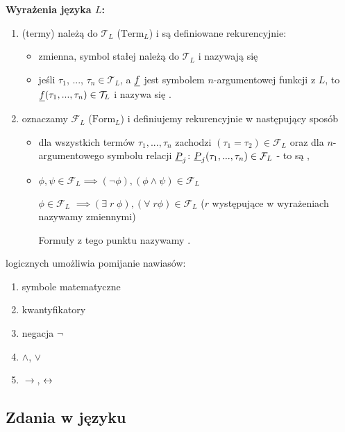 \textbf{Wyrażenia języka $L$:}
\begin{enumerate}[label=\alph*)]
  \item {} (termy) należą do $\mathcal{T}_L$ ($\text{Term}_L$) i są definiowane rekurencyjnie:
    \begin{itemize}
      \item zmienna, symbol stałej należą do $\mathcal{T}_L$ i nazywają się 
      \item jeśli $\tau_1$, ..., $\tau_n\in \mathcal{T}_L$, a $\underline{f}$ jest symbolem $n$-argumentowej funkcji z $L$, to $\underline{f}(\tau_1,...,\tau_n)\in \mathcal{T}_L$ i nazywa się . 
    \end{itemize}
  \item {} oznaczamy $\mathcal{F}_L$ ($\text{Form}_L$) i definiujemy rekurencyjnie w następujący sposób
    \begin{itemize}
      \item dla wszystkich termów $\tau_1,...,\tau_n$ zachodzi $(\tau_1=\tau_2)\in \mathcal{F}_L$ oraz dla $n$-argumentowego symbolu relacji $\underline{P}_j$: $\underline{P}_j(\tau_1,...,\tau_n)\in  \mathcal{F}_L$ - to są ,
      \item $\phi,\psi\in\mathcal{F}_L\implies (\neg \phi), (\phi\land\psi)\in \mathcal{F}_L$

        $\phi\in \mathcal{F}_L$ $\implies (\exists\;r\;\phi),(\forall\;r\phi)\in\mathcal{F}_L$ ($r$ występujące w wyrażeniach nazywamy zmiennymi) 
        
        Formuły z tego punktu nazywamy .
    \end{itemize}
\end{enumerate}

 logicznych umożliwia pomijanie nawiasów:
\begin{enumerate}
  \item symbole matematyczne
  \item kwantyfikatory
  \item negacja $\neg$
  \item $\land$, $\lor$
  \item $\to$, $\leftrightarrow$
\end{enumerate}

\subsection{Zdania w języku}

